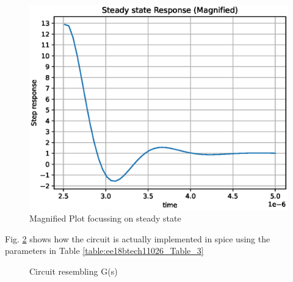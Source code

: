 \begin{enumerate}[label=\arabic*.,ref=\theenumi]
\begin{figure}[!h]
    \centering
    \includegraphics[width=\columnwidth]{./figs/ee18btech11026/ee18btech11026_spice_result_rc_bf_mag.eps}
    \caption{Magnified Plot focussing on steady state}
    \label{fig:ee18btech11026_rc_fb_mag}
\end{figure}


Fig. \ref{fig:ee18btech110026_circuit_2} shows how the circuit is actually implemented in spice using the parameters in Table \ref{table:ee18btech11026_Table_3}  

\begin{figure}[!ht]
	\begin{center}
				\resizebox{\columnwidth}{!}{}
	\end{center}
\caption{Circuit resembling G(s)}
\label{fig:ee18btech110026_circuit_2}
\end{figure}

\begin{table}[!ht]
\centering

\caption{}
\label{table:ee18btech11026_Table_3}
\end{table}

\end{enumerate}

